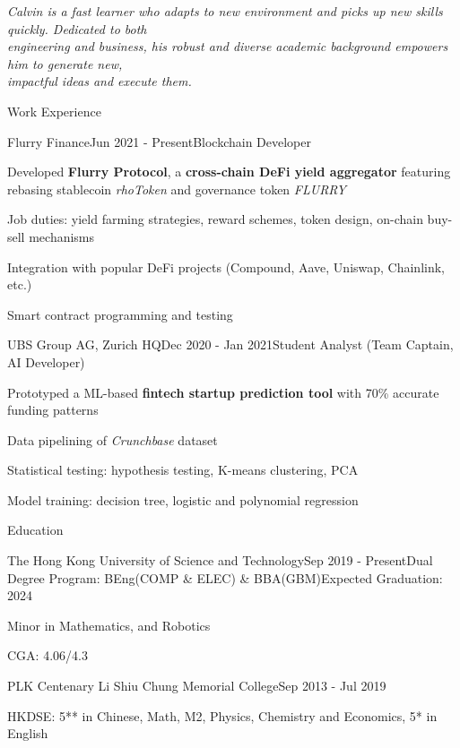\documentclass{resume}
\begin{document}
\emph{Calvin is a fast learner who adapts to new environment and picks up new skills quickly. Dedicated to both}
\\\emph{engineering and business, his robust and diverse academic background
empowers him to generate new,}
\\\emph{impactful ideas and execute them.}

\begin{rSection}{Work Experience}
    
    \begin{rSubsection}{Flurry Finance}{Jun 2021 - Present}{Blockchain Developer}{}
        \item Developed \textbf{Flurry Protocol}, a \textbf{cross-chain DeFi yield aggregator}
        featuring rebasing stablecoin \emph{rhoToken} and governance token \emph{FLURRY}
        \item Job duties: yield farming strategies, reward schemes, token design, on-chain buy-sell mechanisms
        \item Integration with popular DeFi projects (Compound, Aave, Uniswap, Chainlink, etc.)
        \item Smart contract programming and testing
    \end{rSubsection}
    
    \begin{rSubsection}{UBS Group AG, Zurich HQ}{Dec 2020 - Jan 2021}{Student Analyst (Team Captain, AI Developer)}{}
        \item Prototyped a ML-based \textbf{fintech startup prediction tool} with 70\% accurate funding patterns
        \item Data pipelining of \emph{Crunchbase} dataset
        \item Statistical testing: hypothesis testing, K-means clustering, PCA
        \item Model training: decision tree, logistic and polynomial regression
    \end{rSubsection}
    
\end{rSection}

\begin{rSection}{Education}

    \begin{rSubsection}{The Hong Kong University of Science and Technology}{Sep 2019 - Present}{Dual Degree Program: BEng(COMP \& ELEC) \& BBA(GBM)}{Expected Graduation: 2024}
        \item Minor in Mathematics, and Robotics
        \item CGA: 4.06/4.3
    \end{rSubsection}

    \begin{rSubsection}{PLK Centenary Li Shiu Chung Memorial College}{Sep 2013 - Jul 2019}{}{}
        \item HKDSE: 5** in Chinese, Math, M2, Physics, Chemistry and Economics, 5* in English
    \end{rSubsection}

\end{rSection}
\end{document}
